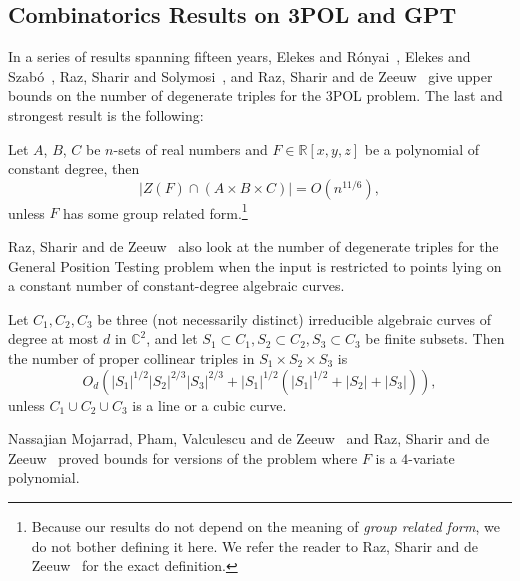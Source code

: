 \subsection{Combinatorics Results on 3POL and GPT}
In a series of results spanning fifteen years,
Elekes and Rónyai~\cite{ER00},
Elekes and Szabó~\cite{ES12},
Raz, Sharir and Solymosi~\cite{RSS14}, and
Raz, Sharir and de Zeeuw~\cite{RSZ15}
give upper bounds on the number of degenerate triples for the 3POL problem.
The last and strongest result is the following:
\begin{theorem}
	Let $A$, $B$, $C$ be $n$-sets of real numbers and $F \in \mathbb{R}[x,y,z]$
	be a polynomial of constant degree, then
	\begin{displaymath}
		| Z(F) \cap ( A \times B \times C ) | = O(n^{11/6}),
	\end{displaymath}
	unless $F$ has some group related form.\footnote{Because our results do not
	depend on the meaning of \emph{group related form}, we do not bother
	defining it here. We refer the reader to Raz, Sharir and de Zeeuw~\cite{RSZ15}
	for the exact definition.}
\end{theorem}

Raz, Sharir and de Zeeuw~\cite{RSZ15} also look at the number of degenerate
triples for the General Position Testing problem when the input is restricted
to points lying on a constant number of constant-degree algebraic curves.
\begin{theorem}\label{thm:rsz15:col}
Let $C_1, C_2, C_3$ be three (not necessarily distinct) irreducible algebraic curves
of degree at most $d$ in $\mathbb{C}^2$, and let $S_1 \subset C_1, S_2 \subset C_2, S_3
\subset C_3$ be finite subsets. Then the
number of proper collinear triples in $S_1 \times S_2 \times S_3$ is
\begin{displaymath}
	O_d( |S_1|^{1/2} |S_2|^{2/3} |S_3|^{2/3} + |S_1|^{1/2} (|S_1|^{1/2} + |S_2| +
|S_3| ) ),
\end{displaymath}
unless $C_1 \cup C_2 \cup C_3$ is a line or a cubic curve.
\end{theorem}

Nassajian Mojarrad, Pham, Valculescu and de Zeeuw~\cite{MPVd16} and
Raz, Sharir and de Zeeuw~\cite{RSZ16} proved bounds for versions of the
problem where $F$ is a $4$-variate polynomial.
